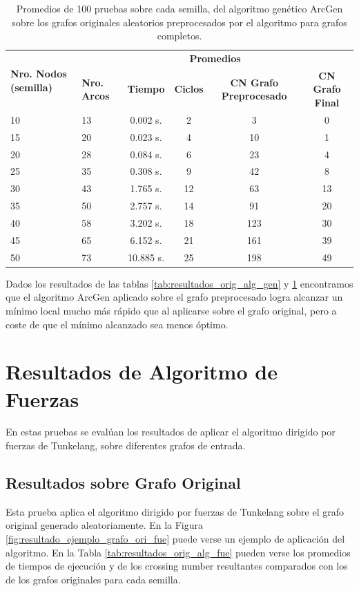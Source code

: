 \begin{table}
	\caption{Promedios de 100 pruebas sobre cada semilla, del algoritmo genético ArcGen sobre los grafos originales aleatorios preprocesados por el algoritmo para grafos completos.}
	\label{tab:resultados_com_alg_gen}
	\begin{center}
	\begin{tabular}{|p{1.5cm}|p{1.5cm}|c|c|c|c|}
		\hline
		\multirow{2}{2cm}{\textbf{Nro. Nodos (semilla)}} & \multicolumn{5}{c|}{\textbf{Promedios}} \\
		\cline{2-6}
		& \textbf{Nro. Arcos} & \textbf{Tiempo} & \textbf{Ciclos} & \textbf{CN Grafo Preprocesado} & \textbf{CN Grafo Final} \\
		\hline
		10 & 13 & 0.002 s. & 2 & 3 & 0 \\
		\hline
		15 & 20 & 0.023 s. & 4 & 10 & 1 \\
		\hline
		20 & 28 & 0.084 s. & 6 & 23 & 4 \\
		\hline
		25 & 35 & 0.308 s. & 9 & 42 & 8 \\
		\hline
		30 & 43 & 1.765 s. & 12 & 63 & 13 \\
		\hline
		35 & 50 & 2.757 s. & 14 & 91 & 20 \\
		\hline
		40 & 58 & 3.202 s. & 18 & 123 & 30 \\
		\hline
		45 & 65 & 6.152 s. & 21 & 161 & 39 \\
		\hline
		50 & 73 & 10.885 s. & 25 & 198 & 49 \\
		\hline
	\end{tabular}
	\end{center}
\end{table}

Dados los resultados de las tablas \ref{tab:resultados_orig_alg_gen} y \ref{tab:resultados_com_alg_gen} encontramos que el algoritmo ArcGen aplicado sobre el grafo preprocesado logra alcanzar un mínimo local mucho más rápido que al aplicarse sobre el grafo original, pero a coste de que el mínimo alcanzado sea menos óptimo.

\section{Resultados de Algoritmo de Fuerzas}
En estas pruebas se evalúan los resultados de aplicar el algoritmo dirigido por fuerzas de Tunkelang, sobre diferentes grafos de entrada.

\subsection{Resultados sobre Grafo Original}
Esta prueba aplica el algoritmo dirigido por fuerzas de Tunkelang sobre el grafo original generado aleatoriamente. En la Figura \ref{fig:resultado_ejemplo_grafo_ori_fue} puede verse un ejemplo de aplicación del algoritmo. En la Tabla \ref{tab:resultados_orig_alg_fue} pueden verse los promedios de tiempos de ejecución y de los crossing number resultantes comparados con los de los grafos originales para cada semilla.

